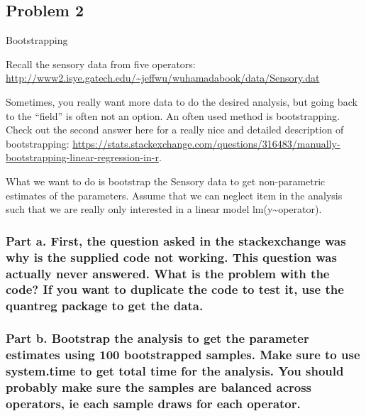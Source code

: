 \documentclass[]{article}
\begin{document}
\hypertarget{problem-2}{%
\subsection{Problem 2}\label{problem-2}}

Bootstrapping

Recall the sensory data from five operators:\\
\url{http://www2.isye.gatech.edu/~jeffwu/wuhamadabook/data/Sensory.dat}

Sometimes, you really want more data to do the desired analysis, but
going back to the ``field'' is often not an option. An often used method
is bootstrapping. Check out the second answer here for a really nice and
detailed description of bootstrapping:
\url{https://stats.stackexchange.com/questions/316483/manually-bootstrapping-linear-regression-in-r}.

What we want to do is bootstrap the Sensory data to get non-parametric
estimates of the parameters. Assume that we can neglect item in the
analysis such that we are really only interested in a linear model
lm(y\textasciitilde{}operator).

\hypertarget{part-a.-first-the-question-asked-in-the-stackexchange-was-why-is-the-supplied-code-not-working.-this-question-was-actually-never-answered.-what-is-the-problem-with-the-code-if-you-want-to-duplicate-the-code-to-test-it-use-the-quantreg-package-to-get-the-data.}{%
\subsubsection{Part a. First, the question asked in the stackexchange
was why is the supplied code not working. This question was actually
never answered. What is the problem with the code? If you want to
duplicate the code to test it, use the quantreg package to get the
data.}\label{part-a.-first-the-question-asked-in-the-stackexchange-was-why-is-the-supplied-code-not-working.-this-question-was-actually-never-answered.-what-is-the-problem-with-the-code-if-you-want-to-duplicate-the-code-to-test-it-use-the-quantreg-package-to-get-the-data.}}

\hypertarget{part-b.-bootstrap-the-analysis-to-get-the-parameter-estimates-using-100-bootstrapped-samples.-make-sure-to-use-system.time-to-get-total-time-for-the-analysis.-you-should-probably-make-sure-the-samples-are-balanced-across-operators-ie-each-sample-draws-for-each-operator.}{%
\subsubsection{Part b. Bootstrap the analysis to get the parameter
estimates using 100 bootstrapped samples. Make sure to use system.time
to get total time for the analysis. You should probably make sure the
samples are balanced across operators, ie each sample draws for each
operator.}\label{part-b.-bootstrap-the-analysis-to-get-the-parameter-estimates-using-100-bootstrapped-samples.-make-sure-to-use-system.time-to-get-total-time-for-the-analysis.-you-should-probably-make-sure-the-samples-are-balanced-across-operators-ie-each-sample-draws-for-each-operator.}}
\end{document}
